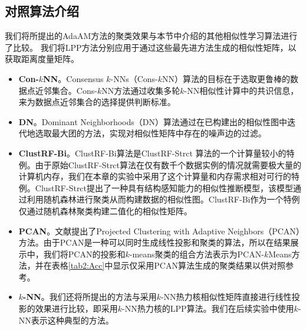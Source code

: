 \subsection{对照算法介绍}
我们将所提出的AdaAM方法的聚类效果与本节中介绍的其他相似性学习算法进行了比较。 我们将LPP方法分别应用于通过这些最先进方法生成的相似性矩阵，以获取距离度量矩阵。

\begin{itemize}
	\item \textbf{Con-$k$NN}。Consensus $k$-NNs（Cons-$k$NN）算法\cite{premachandran2013consensus}的目标在于选取更鲁棒的数据点近邻集合。Cons-$k$NN方法通过收集多轮$k$-NN相似性计算中的共识信息，来为数据点近邻集合的选择提供判断标准。
	\item \textbf{DN}。Dominant Neighborhoods（DN）算法\cite{pavan2007dominant}通过在已构建出的相似性图中迭代地选取最大团的方法，实现对相似性矩阵中存在的噪声边的过滤。
	\item \textbf{ClustRF-Bi}。ClustRF-Bi算法\cite{criminisi2012decision,pei2013unsupervised}是ClustRF-Strct \cite{zhu2014constructing}算法的一个计算量较小的特例。由于原始ClustRF-Strct算法在仅有数千个数据实例的情况就需要极大量的计算机内存，我们在本章的实验中采用了这个计算量和内存需求相对可行的特例。ClustRF-Strct提出了一种具有结构感知能力的相似性推断模型，该模型通过利用随机森林进行聚类从而构建数据的相似性图。ClustRF-Bi作为一个特例仅通过随机森林聚类构建二值化的相似性矩阵。
	\item \textbf{PCAN}。文献\parencite{nie2014clustering}提出了Projected Clustering with Adaptive Neighbors（PCAN）方法。由于PCAN是一种可以同时生成线性投影和聚类的算法，所以在结果展示中，我们将PCAN的投影和$k$-means聚类的组合方法表示为PCAN-$k$Means方法，并在表格\ref{tab2:Acc}中显示仅采用PCAN算法生成的聚类结果以供对照参考。
	\item \textbf{$k$-NN}。我们还将所提出的方法与采用$k$-NN热力核相似性矩阵直接进行线性投影的效果进行比较，即采用$k$-NN热力核的LPP算法。我们在后续实验中使用$k$-NN表示这种典型的方法。


\end{itemize}
